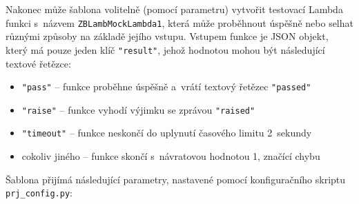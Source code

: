 \documentclass[czech, ing, kiv, he, iso690]{fasthesis}
\begin{document}
Nakonec může šablona volitelně (pomocí parametru) vytvořit testovací Lambda funkci s~názvem \verb|ZBLambMockLambda1|, která může proběhnout úspěšně nebo selhat různými způsoby na základě jejího vstupu. Vstupem funkce je JSON objekt, který má pouze jeden klíč \verb|"result"|, jehož hodnotou mohou být následující textové řetězce: 

\begin{itemize}
    \item \verb|"pass"| -- funkce proběhne úspěšně a~vrátí textový řetězec \verb|"passed"|
    \item \verb|"raise"| -- funkce vyhodí výjimku se zprávou \verb|"raised"|
    \item \verb|"timeout"| -- funkce neskončí do uplynutí časového limitu 2~sekundy
    \item cokoliv jiného -- funkce skončí s~návratovou hodnotou 1, značící chybu
\end{itemize}

Šablona přijímá následující parametry, nastavené pomocí konfiguračního skriptu \verb|prj_config.py|:
\end{document}
